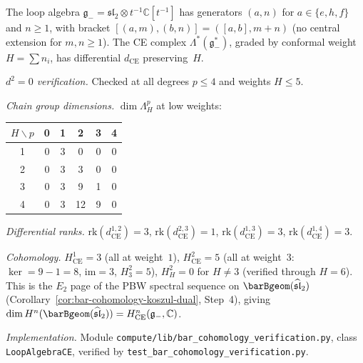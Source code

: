 \begin{computation}
\label{comp:sl2-ce-verification}
\ClaimStatusProvedHere
{}

The loop algebra
$\mathfrak{g}_- = \mathfrak{sl}_2 \otimes t^{-1}\mathbb{C}[t^{-1}]$
has generators $(a, n)$ for $a \in \{e, h, f\}$ and $n \geq 1$,
with bracket
$[(a, m), (b, n)] = ([a, b], m + n)$
(no central extension for $m, n \geq 1$).
The CE complex $\Lambda^*(\mathfrak{g}_-^*)$,
graded by conformal weight $H = \sum n_i$,
has differential $d_{\mathrm{CE}}$ preserving~$H$.

\emph{$d^2 = 0$ verification.}
Checked at all degrees $p \leq 4$ and weights $H \leq 5$.

\emph{Chain group dimensions.}
$\dim \Lambda^p_H$ at low weights:
\begin{center}
\renewcommand{\arraystretch}{1.1}
\begin{tabular}{c|ccccc}
$H \backslash p$ & 0 & 1 & 2 & 3 & 4 \\
\hline
1 & 0 & 3 & 0 & 0 & 0 \\
2 & 0 & 3 & 3 & 0 & 0 \\
3 & 0 & 3 & 9 & 1 & 0 \\
4 & 0 & 3 & 12 & 9 & 0
\end{tabular}
\end{center}

\emph{Differential ranks.}
$\mathrm{rk}(d^{1,2}_{\mathrm{CE}}) = 3$,
$\mathrm{rk}(d^{2,3}_{\mathrm{CE}}) = 1$,
$\mathrm{rk}(d^{1,3}_{\mathrm{CE}}) = 3$,
$\mathrm{rk}(d^{1,4}_{\mathrm{CE}}) = 3$.

\emph{Cohomology.}
$H^1_{\mathrm{CE}} = 3$ (all at weight~$1$),
$H^2_{\mathrm{CE}} = 5$ (all at weight~$3$:
$\ker = 9 - 1 = 8$, $\mathrm{im} = 3$, $H^2_3 = 5$),
$H^2_H = 0$ for $H \neq 3$ (verified through $H = 6$).
This is the $E_2$ page of the PBW spectral
sequence on $\barBgeom(\widehat{\mathfrak{sl}}_2)$
(Corollary~\ref{cor:bar-cohomology-koszul-dual}, Step~4),
giving $\dim H^n(\barBgeom(\widehat{\mathfrak{sl}}_2))
= H^n_{\mathrm{CE}}(\mathfrak{g}_-, \mathbb{C})$.

\emph{Implementation.}
Module \texttt{compute/lib/bar\_cohomology\_verification.py},
class \texttt{LoopAlgebraCE}, verified by
\texttt{test\_bar\_cohomology\_verification.py}.
\end{computation}

